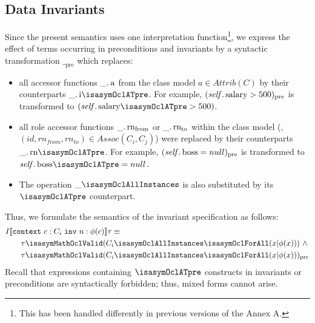 \subsection{Data Invariants}
\label{sec:invlogic}
Since the present \OCL semantics uses one interpretation function\footnote{This has been handled
differently in previous versions of the Annex A.}, we express the effect of \OCL terms
occurring in preconditions and invariants by a syntactic transformation $\__\text{pre}$ which
replaces:
\begin{itemize}
\item all accessor functions $\getAttrib{\_}{a}$ from the class model $a \in Attrib(C)$ by their
counterparts $\getAttrib{\_}{i\isasymOclATpre}$. For example, $(\getAttrib{\self}{salary} >
500)_\text{pre}$ is transformed to $(\getAttrib{\self}{salary\isasymOclATpre} > 500)$.
\item all role accessor functions  $\getRole{\_}{rn_{from}}$ or  $\getRole{\_}{rn_{to}}$
      within the class model (\ie, $(id, rn_{from},  rn_{to}) \in Assoc(C_i, C_j)$)
      were replaced by their counterparts $\getRole{\_}{rn\isasymOclATpre}$.
      For example, $(\getAttrib{\self}{boss} = null)_\text{pre}$ is transformed to
      $\getAttrib{\self}{boss\isasymOclATpre} = null$.
\item The operation $\_\isasymOclAllInstances$ is also substituted by its
$\isasymOclATpre$ counterpart.
\end{itemize}
Thus, we formulate the semantics of the invariant specification  as follows:
\begin{gather}\label{eq:inv}
\begin{aligned}
& I\semantics{\mathtt{context}~c:C_i~\mathtt{inv}~n: \phi(c)} \tau \equiv  \\
&\qquad \tau  \isasymMathOclValid  (C_i\isasymOclAllInstances\isasymOclForAll(x
\text{|} \phi(x)))~\land \\
&\qquad \tau  \isasymMathOclValid (C_i\isasymOclAllInstances\isasymOclForAll(x
\text{|} \phi(x)))_\text{pre}
\end{aligned}
\end{gather}
Recall that  expressions containing $\isasymOclATpre$ constructs in
invariants or preconditions are syntactically forbidden; thus, mixed forms cannot arise.

